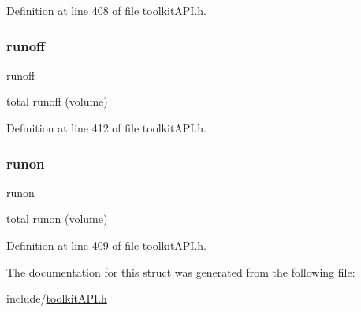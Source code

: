 Definition at line 408 of file toolkit\+A\+P\+I.\+h.

\mbox{\label{struct_s_m___subcatch_stats_a4dcd362194c38698fe8f5b2659ba2dc6}} 
\subsubsection{\texorpdfstring{runoff}{runoff}}
{\footnotesize\ttfamily runoff}

total runoff (volume) 

Definition at line 412 of file toolkit\+A\+P\+I.\+h.

\mbox{\label{struct_s_m___subcatch_stats_ac05f157303936535978c7e69f6dfb16f}} 
\subsubsection{\texorpdfstring{runon}{runon}}
{\footnotesize\ttfamily runon}

total runon (volume) 

Definition at line 409 of file toolkit\+A\+P\+I.\+h.



The documentation for this struct was generated from the following file\+:\begin{DoxyCompactItemize}
\item 
include/\hyperlink{toolkit_a_p_i_8h}{toolkit\+A\+P\+I.\+h}\end{DoxyCompactItemize}

